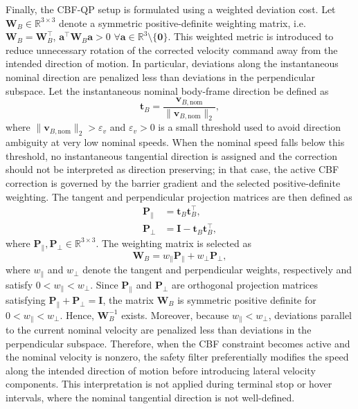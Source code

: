 \documentclass[journal]{IEEEtran}
\newcommand{\R}{\mathbb{R}}
\begin{document}
Finally, the CBF-QP setup is formulated using a weighted deviation cost.
Let $\bm{W}_{B}\in\R^{3\times3}$ denote a symmetric positive-definite weighting matrix, i.e. $\bm{W}_{B}=\bm{W}_{B}^{\top}$, $\bm{a}^{\top}\bm{W}_{B}\bm{a}>0$   $\forall \bm{a}\in\R^{3}\setminus\{\bm{0}\}$. This weighted metric is introduced to reduce unnecessary rotation of the corrected velocity command away from the intended direction of motion. In particular, deviations along the instantaneous nominal direction are penalized less than deviations in the perpendicular subspace. Let the instantaneous nominal body-frame direction be defined as
\begin{equation}
  \bm{t}_{B}
  =
  \frac{\bm{v}_{B,\mathrm{nom}}}
  {\|\bm{v}_{B,\mathrm{nom}}\|_{2}},
  \label{eq:nominal_tangent_direction}
\end{equation}
where $\|\bm{v}_{B,\mathrm{nom}}\|_{2}>\varepsilon_v$ and $\varepsilon_v>0$ is a small threshold used to avoid direction ambiguity at very low nominal speeds. When the nominal speed falls below this threshold, no instantaneous tangential direction is assigned and the correction should not be interpreted as direction preserving; in that case, the active CBF correction is governed by the barrier gradient and the selected positive-definite weighting. The tangent and perpendicular projection matrices are then defined as
\begin{align}
  \bm{P}_{\parallel} &= \bm{t}_{B}\bm{t}_{B}^{\top}, \\
  \bm{P}_{\perp} &= \bm{I}-\bm{t}_{B}\bm{t}_{B}^{\top},
  \label{eq:tangent_perpendicular_projection}
\end{align}
where $\bm{P}_{\parallel},\bm{P}_{\perp}\in\R^{3\times3}$. The weighting
matrix is selected as
\begin{equation}
  \bm{W}_{B}
  =
  w_{\parallel}\bm{P}_{\parallel}
  +
  w_{\perp}\bm{P}_{\perp},
  \label{eq:weighted_metric_matrix}
\end{equation}
where $w_{\parallel}$ and $w_{\perp}$ denote the tangent and perpendicular
weights, respectively and satisfy $0<w_{\parallel}<w_{\perp}$. Since $\bm{P}_{\parallel}$ and $\bm{P}_{\perp}$ are orthogonal projection matrices satisfying
$\bm{P}_{\parallel}+\bm{P}_{\perp}=\bm{I}$, the matrix $\bm{W}_{B}$ is symmetric positive definite for $0<w_{\parallel}<w_{\perp}$. Hence, $\bm{W}_{B}^{-1}$ exists. Moreover, because $w_{\parallel}<w_{\perp}$, deviations parallel to the current nominal velocity are penalized less than deviations in the perpendicular subspace. Therefore, when the CBF constraint becomes active and the nominal velocity is nonzero, the safety filter preferentially modifies the speed along the intended direction of motion before introducing lateral velocity components. This interpretation is not applied during terminal stop or hover intervals, where the nominal tangential direction is not well-defined.
\end{document}
